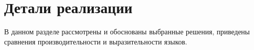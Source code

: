\section{Детали реализации}
В данном разделе рассмотрены и обоснованы выбранные решения, приведены сравнения производительности и выразительности языков.




